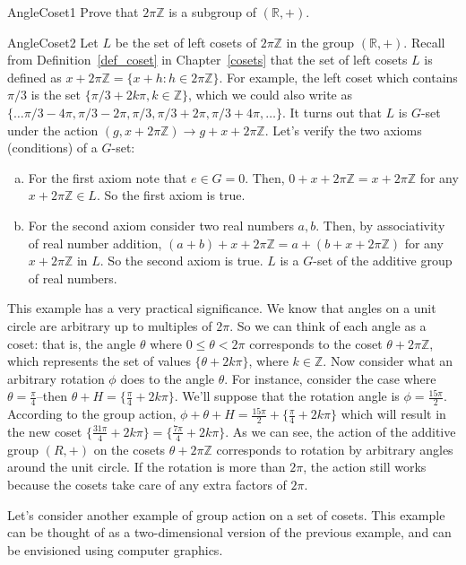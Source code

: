 \begin{exercise}{AngleCoset1}
Prove that $2 \pi \mathbb{Z}$ is a subgroup of $(\mathbb{R},+)$.
\end{exercise}
\begin {example}{AngleCoset2}
Let $L$ be the set of left cosets of $2\pi \mathbb{Z}$ in the group $(\mathbb{R},+)$.  Recall from Definition~\ref{def_coset} in Chapter~\ref{cosets} that the set of left cosets $L$ is defined as $x+2\pi \mathbb{Z}=\{x+h:h\in 2\pi\mathbb{Z}\}$.  For example, the left coset which contains $\pi/3$ is the set $ \{\pi/3 +2k\pi, k\in \mathbb{Z}\}$, which we could also write as $\{ \ldots \pi/3-4\pi, \pi/3-2\pi, \pi/3, \pi/3+2\pi, \pi/3 + 4\pi, \ldots \}$.  It turns out that $L$ is $G$-set under the action  
$(g,x+2\pi\mathbb{Z}) \rightarrow g+x+2\pi\mathbb{Z}$. Let's verify the two axioms (conditions) of a $G$-set:
\begin{enumerate}[(a)]
\item
 For the first axiom note that $e\in G=0$. Then, $0+x+2\pi\mathbb{Z}=x+2\pi\mathbb{Z}$ for any $x+2\pi\mathbb{Z}\in L$.  So the first axiom is true.
\item 
For the second axiom consider two real numbers $a,b$.  Then, by associativity of real number addition, $(a+b)+x+2\pi\mathbb{Z}=a+(b+x+2\pi\mathbb{Z})$ for any $x+2\pi\mathbb{Z}$  in $L$.  So the second axiom is true.  $L$ is a $G$-set of the additive group of real numbers.
\end {enumerate}
This example has a very practical significance. We know that angles on a unit circle are arbitrary up to multiples of $2\pi$. So we can think of each angle as a coset:  that is, the angle $\theta$ where $0\leq\theta<2\pi$ corresponds to  the coset $\theta + 2\pi \mathbb{Z}$, which represents the set of values $\{\theta +2k\pi\}$, where $k \in \mathbb{Z}$. Now consider what an arbitrary rotation $\phi$ does to the angle $\theta$. For instance, consider the case where $\theta=\frac{\pi}{4}$--then $\theta+H=\{ \frac{\pi}{4}+2k\pi\}$.  We'll suppose that the rotation angle is $\phi=\frac{15\pi}{2}$.  According to the group action, $\phi+\theta+H =\frac{15\pi}{2}+\{\frac{\pi}{4}+2k\pi\}$ which will result in the new coset $\{\frac{31\pi}{4}+2k\pi\}=\{\frac{7\pi}{4}+2k\pi\}$.
As we can see, the action of the additive group $(R,+)$ on the cosets $\theta + 2\pi \mathbb{Z}$ corresponds to rotation by arbitrary angles around the unit circle. If the rotation is more than $2 \pi$, the action still works because the cosets take care of any extra factors of $2 \pi$.
\end {example}
Let's consider another example of group action on a set of cosets.  This example can be thought of as a two-dimensional version of the previous example, and can be envisioned using computer graphics.

